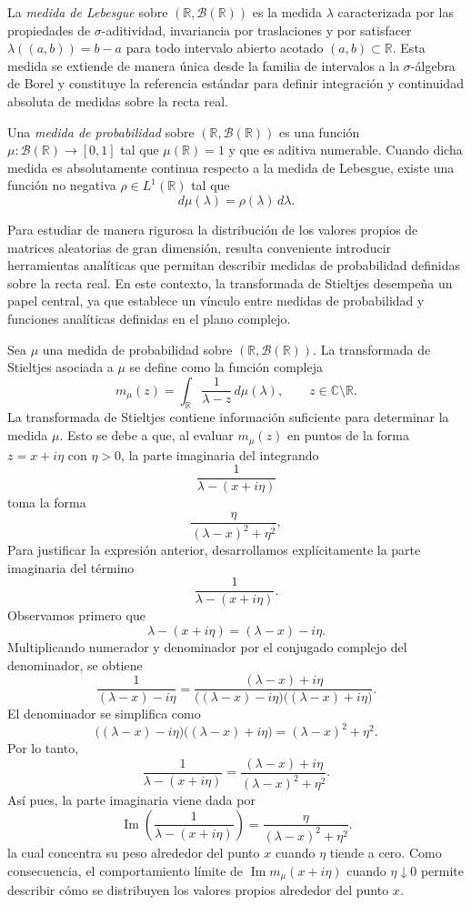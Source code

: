 \documentclass[letterpaper,12pt,oneside]{book}
\begin{document}
La \emph{medida de Lebesgue} sobre $(\mathbb{R}, \mathcal{B}(\mathbb{R}))$ es la medida $\lambda$ caracterizada por las propiedades de $\sigma$-aditividad, invariancia por traslaciones y por satisfacer $\lambda((a,b)) = b-a$ para todo intervalo abierto acotado $(a,b) \subset \mathbb{R}$.
Esta medida se extiende de manera única desde la familia de intervalos a la $\sigma$-álgebra de Borel y constituye la referencia estándar para definir integración y continuidad absoluta de medidas sobre la recta real.

Una \emph{medida de probabilidad} sobre $(\mathbb{R}, \mathcal{B}(\mathbb{R}))$ es una función
$\mu : \mathcal{B}(\mathbb{R}) \to [0,1]$ tal que $\mu(\mathbb{R}) = 1$ y que es aditiva numerable.
Cuando dicha medida es absolutamente continua respecto a la medida de Lebesgue, existe una función
no negativa $\rho \in L^1(\mathbb{R})$ tal que
\[
d\mu(\lambda) = \rho(\lambda)\, d\lambda.
\]

Para estudiar de manera rigurosa la distribución de los valores propios de matrices aleatorias de gran dimensión, resulta conveniente introducir herramientas analíticas que permitan describir medidas de probabilidad definidas sobre la recta real. En este contexto, la transformada de Stieltjes desempeña un papel central, ya que establece un vínculo entre medidas de probabilidad y funciones analíticas definidas en el plano complejo.

Sea $\mu$ una medida de probabilidad sobre $(\mathbb{R}, \mathcal{B}(\mathbb{R}))$. La transformada de Stieltjes asociada a $\mu$ se define como la función compleja
\[
m_\mu(z) = \int_{\mathbb{R}} \frac{1}{\lambda - z}\, d\mu(\lambda),
\qquad z \in \mathbb{C} \setminus \mathbb{R}.
\]
La transformada de Stieltjes contiene información suficiente para determinar la medida
$\mu$. Esto se debe a que, al evaluar $m_\mu(z)$ en puntos de la forma
$z = x + i\eta$ con $\eta > 0$, la parte imaginaria del integrando
\[
\frac{1}{\lambda - (x+i\eta)}
\]
toma la forma
\[
\frac{\eta}{(\lambda-x)^2+\eta^2},
\]
Para justificar la expresión anterior, desarrollamos explícitamente la parte imaginaria
del término
\[
\frac{1}{\lambda-(x+i\eta)}.
\]
Observamos primero que
\[
\lambda-(x+i\eta) = (\lambda-x) - i\eta.
\]
Multiplicando numerador y denominador por el conjugado complejo del denominador,
se obtiene
\[
\frac{1}{(\lambda-x)-i\eta}
=
\frac{(\lambda-x)+i\eta}{\big((\lambda-x)-i\eta\big)\big((\lambda-x)+i\eta\big)}.
\]
El denominador se simplifica como
\[
\big((\lambda-x)-i\eta\big)\big((\lambda-x)+i\eta\big)
=
(\lambda-x)^2 + \eta^2.
\]
Por lo tanto,
\[
\frac{1}{\lambda-(x+i\eta)}
=
\frac{(\lambda-x)+i\eta}{(\lambda-x)^2+\eta^2}.
\]
Así pues, la parte imaginaria viene dada por
\[
\operatorname{Im}\!\left(\frac{1}{\lambda-(x+i\eta)}\right)
=
\frac{\eta}{(\lambda-x)^2+\eta^2}.
\]
la cual concentra su peso alrededor del punto $x$ cuando $\eta$ tiende a cero.
Como consecuencia, el comportamiento límite de $\operatorname{Im} m_\mu(x+i\eta)$
cuando $\eta \downarrow 0$ permite describir cómo se distribuyen los valores propios alrededor del punto $x$.
\end{document}
